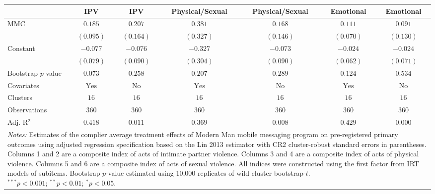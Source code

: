 
\begin{tabular}{l c c c c c c}
\toprule
 & IPV & IPV & Physical/Sexual & Physical/Sexual & Emotional & Emotional \\
\midrule
MMC                 & $0.185$        & $0.207$       & $0.381$        & $0.168$       & $0.111$        & $0.091$       \\
                    & $(0.095)$      & $(0.164)$     & $(0.327)$      & $(0.146)$     & $(0.070)$      & $(0.130)$     \\
Constant            & $-0.077$       & $-0.076$      & $-0.327$       & $-0.073$      & $-0.024$       & $-0.024$      \\
                    & $(0.079)$      & $(0.090)$     & $(0.304)$      & $(0.090)$     & $(0.062)$      & $(0.071)$     \\
\midrule
Bootstrap $p$-value & $0.073$        & $0.258$       & $0.207$        & $0.289$       & $0.124$        & $0.534$       \\
Covariates          & $\textrm{Yes}$ & $\textrm{No}$ & $\textrm{Yes}$ & $\textrm{No}$ & $\textrm{Yes}$ & $\textrm{No}$ \\
Clusters            & $16$           & $16$          & $16$           & $16$          & $16$           & $16$          \\
Observations        & $360$          & $360$         & $360$          & $360$         & $360$          & $360$         \\
Adj. R$^2$          & $0.418$        & $0.011$       & $0.369$        & $0.008$       & $0.429$        & $0.000$       \\
\bottomrule
\multicolumn{7}{l}{\scriptsize{\parbox{\linewidth}{\vspace{2pt} 
       \textit{Notes:} Estimates of the complier average treatment effects of Modern Man mobile 
       messaging program on pre-registered primary outcomes using adjusted regression 
       specification based on the Lin 2013 estimator with CR2 cluster-robust 
       standard errors in parentheses. Columns 1 and 2 are a composite index of 
       acts of intimate partner violence. Columns 3 and 4 are a composite index of acts
       of physical violence. Columns 5 and 6 are a composite index of acts of sexual violence.
       All indices were constructed using the first factor from IRT models of subitems. 
       Bootstrap $p$-value estimated using 10,000 replicates of wild cluster bootstrap-$t$. \\ $^{***}p<0.001$; $^{**}p<0.01$; $^{*}p<0.05$.}}}
\end{tabular}
